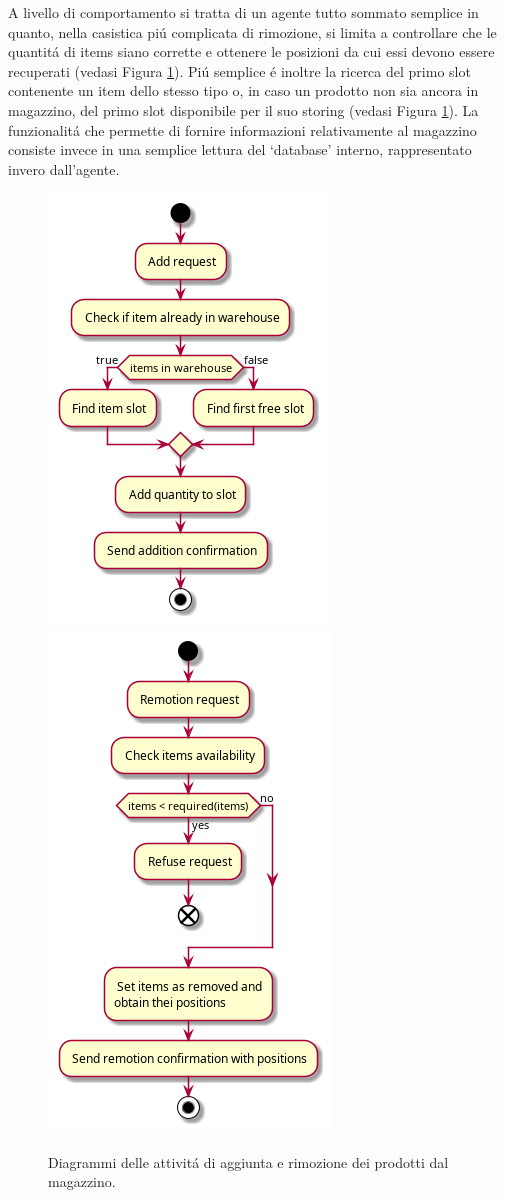 A livello di comportamento si tratta di un agente tutto sommato semplice in quanto, nella casistica pi\'u complicata di rimozione, si limita a controllare che le quantit\'a di items siano corrette e ottenere le posizioni da cui essi devono essere recuperati (vedasi Figura \ref{fig:wm-activity_diagrams}). Pi\'u semplice \'e inoltre la ricerca del primo slot contenente un item dello stesso tipo o, in caso un prodotto non sia ancora in magazzino, del primo slot disponibile per il suo storing (vedasi Figura \ref{fig:wm-activity_diagrams}). La funzionalit\'a che permette di fornire informazioni relativamente al magazzino consiste invece in una semplice lettura del `database' interno, rappresentato invero dall'agente.
\begin{figure}[!ht]\centering
    \includegraphics[width=.45\textwidth]{section/design/figure/warehouse_mapper/activity_diagram-add.png}
    \includegraphics[width=.45\textwidth]{section/design/figure/warehouse_mapper/activity_diagram-remove.png}
    \caption{Diagrammi delle attivit\'a di aggiunta e rimozione dei prodotti dal magazzino.}
    \label{fig:wm-activity_diagrams}
\end{figure}

